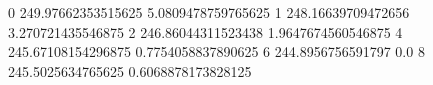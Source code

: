 0 249.97662353515625 5.0809478759765625
1 248.16639709472656 3.270721435546875
2 246.86044311523438 1.9647674560546875
4 245.67108154296875 0.7754058837890625
6 244.8956756591797 0.0
8 245.5025634765625 0.6068878173828125
